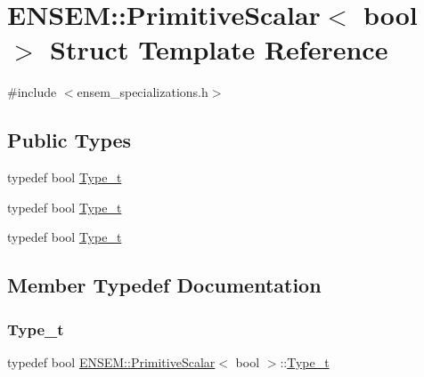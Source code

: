 \hypertarget{structENSEM_1_1PrimitiveScalar_3_01bool_01_4}{}\section{E\+N\+S\+EM\+:\+:Primitive\+Scalar$<$ bool $>$ Struct Template Reference}
\label{structENSEM_1_1PrimitiveScalar_3_01bool_01_4}


{\ttfamily \#include $<$ensem\+\_\+specializations.\+h$>$}

\subsection*{Public Types}
\begin{DoxyCompactItemize}
\item 
typedef bool \mbox{\hyperlink{structENSEM_1_1PrimitiveScalar_3_01bool_01_4_a3433ef77cf65b05846eddc474f588a73}{Type\+\_\+t}}
\item 
typedef bool \mbox{\hyperlink{structENSEM_1_1PrimitiveScalar_3_01bool_01_4_a3433ef77cf65b05846eddc474f588a73}{Type\+\_\+t}}
\item 
typedef bool \mbox{\hyperlink{structENSEM_1_1PrimitiveScalar_3_01bool_01_4_a3433ef77cf65b05846eddc474f588a73}{Type\+\_\+t}}
\end{DoxyCompactItemize}


\subsection{Member Typedef Documentation}
\mbox{\label{structENSEM_1_1PrimitiveScalar_3_01bool_01_4_a3433ef77cf65b05846eddc474f588a73}} 
\subsubsection{\texorpdfstring{Type\_t}{Type\_t}\hspace{0.1cm}{\footnotesize\ttfamily [1/3]}}
{\footnotesize\ttfamily typedef bool \mbox{\hyperlink{structENSEM_1_1PrimitiveScalar}{E\+N\+S\+E\+M\+::\+Primitive\+Scalar}}$<$ bool $>$\+::\mbox{\hyperlink{structENSEM_1_1PrimitiveScalar_3_01bool_01_4_a3433ef77cf65b05846eddc474f588a73}{Type\+\_\+t}}}

